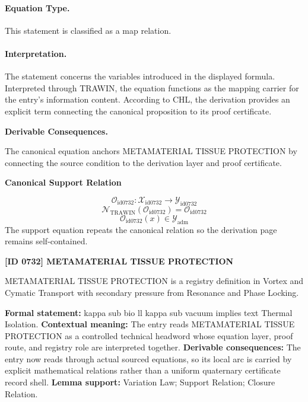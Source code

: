 \paragraph{Equation Type.}
This statement is classified as a map relation.

\paragraph{Interpretation.}
The statement concerns the variables introduced in the displayed formula. Interpreted through TRAWIN, the equation functions as the mapping carrier for the entry’s information content. According to CHL, the derivation provides an explicit term connecting the canonical proposition to its proof certificate.

\par\vspace{0.35em}
\noindent\textbf{Derivable Consequences.}\quad
\begingroup
\footnotesize
\raggedright
The canonical equation anchors METAMATERIAL TISSUE PROTECTION by connecting the source condition to the derivation layer and proof certificate.
\par\endgroup

\noindent\textbf{Canonical Support Relation}\par
\[
\mathcal{O}_{\mathrm{id0732}}:\mathcal{X}_{\mathrm{id0732}}\longrightarrow\mathcal{Y}_{\mathrm{id0732}}
\]
\[
\mathcal{N}_{\mathrm{TRAWIN}}(\mathcal{O}_{\mathrm{id0732}})=\mathcal{O}_{\mathrm{id0732}}
\]
\[
\mathcal{O}_{\mathrm{id0732}}(x)\in\mathcal{Y}_{\mathrm{adm}}
\]
\noindent The support equation repeats the canonical relation so the derivation page remains self-contained.\par

\clearpage
\noindent\textbf{[ID 0732] METAMATERIAL TISSUE PROTECTION}\par
\vspace{0.35em}
\begingroup\small
{}
METAMATERIAL TISSUE PROTECTION is a registry definition in Vortex and Cymatic Transport with secondary pressure from Resonance and Phase Locking.

\begingroup\footnotesize\setlength{\emergencystretch}{3em}\sloppy
\textbf{Formal statement:} kappa sub bio ll kappa sub vacuum implies text Thermal Isolation. \textbf{Contextual meaning:} The entry reads METAMATERIAL TISSUE PROTECTION as a controlled technical headword whose equation layer, proof route, and registry role are interpreted together. \textbf{Derivable consequences:} The entry now reads through actual sourced equations, so its local arc is carried by explicit mathematical relations rather than a uniform quaternary certificate record shell. \textbf{Lemma support:} Variation Law; Support Relation; Closure Relation.\par
\endgroup

